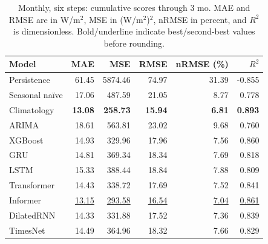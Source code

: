 \begin{table}[!htbp]
\centering
\small
\setlength{\tabcolsep}{6pt}
\caption{Monthly, six steps: cumulative scores through 3 mo. MAE and RMSE are in W/m$^2$, MSE in (W/m$^2$)$^2$, nRMSE in percent, and $R^2$ is dimensionless. Bold/underline indicate best/second-best values before rounding.}
\label{tab:baseline_monthly_6_3}
\begin{tabular}{@{}lrrrrr@{}}
\toprule
Model & MAE & MSE & RMSE & nRMSE (\%) & $R^2$ \\
\midrule
Persistence & 61.45 & 5874.46 & 74.97 & 31.39 & -0.855 \\
Seasonal na\"ive & 17.06 & 487.59 & 21.05 & 8.77 & 0.778 \\
Climatology & \textbf{13.08} & \textbf{258.73} & \textbf{15.94} & \textbf{6.81} & \textbf{0.893} \\
ARIMA & 18.61 & 563.81 & 23.02 & 9.68 & 0.760 \\
XGBoost & 14.93 & 329.96 & 17.96 & 7.56 & 0.860 \\
GRU & 14.81 & 369.34 & 18.34 & 7.69 & 0.818 \\
LSTM & 15.33 & 388.44 & 18.84 & 7.88 & 0.809 \\
Transformer & 14.43 & 338.72 & 17.69 & 7.52 & 0.841 \\
Informer & \underline{13.15} & \underline{293.58} & \underline{16.54} & \underline{7.04} & \underline{0.861} \\
DilatedRNN & 14.33 & 331.88 & 17.52 & 7.36 & 0.839 \\
TimesNet & 14.49 & 364.96 & 18.32 & 7.66 & 0.829 \\
\bottomrule
\end{tabular}
\end{table}

